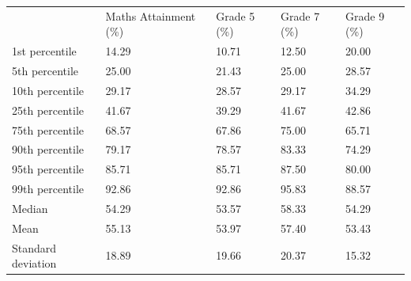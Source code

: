 \documentclass{article}
\begin{document}
\begin{table}[!h]
\centering
\begin{tabular}{lllll}
\cline{1-5}
\multicolumn{1}{|l}{} &
  \multicolumn{1}{|l}{Maths Attainment (\%)} &
  \multicolumn{1}{|l}{Grade 5 (\%)} &
  \multicolumn{1}{|l}{Grade 7 (\%)} &
  \multicolumn{1}{|l|}{Grade 9 (\%)} \\
\cline{1-5}
\multicolumn{1}{|l}{1st percentile} &
  \multicolumn{1}{|l}{14.29} &
  \multicolumn{1}{|l}{10.71} &
  \multicolumn{1}{|l}{12.50} &
  \multicolumn{1}{|l|}{20.00} \\
\cline{1-5}
\multicolumn{1}{|l}{5th percentile} &
  \multicolumn{1}{|l}{25.00} &
  \multicolumn{1}{|l}{21.43} &
  \multicolumn{1}{|l}{25.00} &
  \multicolumn{1}{|l|}{28.57} \\
\cline{1-5}
\multicolumn{1}{|l}{10th percentile} &
  \multicolumn{1}{|l}{29.17} &
  \multicolumn{1}{|l}{28.57} &
  \multicolumn{1}{|l}{29.17} &
  \multicolumn{1}{|l|}{34.29} \\
\cline{1-5}
\multicolumn{1}{|l}{25th percentile} &
  \multicolumn{1}{|l}{41.67} &
  \multicolumn{1}{|l}{39.29} &
  \multicolumn{1}{|l}{41.67} &
  \multicolumn{1}{|l|}{42.86} \\
\cline{1-5}
\multicolumn{1}{|l}{75th percentile} &
  \multicolumn{1}{|l}{68.57} &
  \multicolumn{1}{|l}{67.86} &
  \multicolumn{1}{|l}{75.00} &
  \multicolumn{1}{|l|}{65.71} \\
\cline{1-5}
\multicolumn{1}{|l}{90th percentile} &
  \multicolumn{1}{|l}{79.17} &
  \multicolumn{1}{|l}{78.57} &
  \multicolumn{1}{|l}{83.33} &
  \multicolumn{1}{|l|}{74.29} \\
\cline{1-5}
\multicolumn{1}{|l}{95th percentile} &
  \multicolumn{1}{|l}{85.71} &
  \multicolumn{1}{|l}{85.71} &
  \multicolumn{1}{|l}{87.50} &
  \multicolumn{1}{|l|}{80.00} \\
\cline{1-5}
\multicolumn{1}{|l}{99th percentile} &
  \multicolumn{1}{|l}{92.86} &
  \multicolumn{1}{|l}{92.86} &
  \multicolumn{1}{|l}{95.83} &
  \multicolumn{1}{|l|}{88.57} \\
\cline{1-5}
\multicolumn{1}{|l}{Median} &
  \multicolumn{1}{|l}{54.29} &
  \multicolumn{1}{|l}{53.57} &
  \multicolumn{1}{|l}{58.33} &
  \multicolumn{1}{|l|}{54.29} \\
\cline{1-5}
\multicolumn{1}{|l}{Mean} &
  \multicolumn{1}{|l}{55.13} &
  \multicolumn{1}{|l}{53.97} &
  \multicolumn{1}{|l}{57.40} &
  \multicolumn{1}{|l|}{53.43} \\
\cline{1-5}
\multicolumn{1}{|l}{Standard deviation} &
  \multicolumn{1}{|l}{18.89} &
  \multicolumn{1}{|l}{19.66} &
  \multicolumn{1}{|l}{20.37} &
  \multicolumn{1}{|l|}{15.32} \\
\cline{1-5}
\end{tabular}
\end{table}
\end{document}
